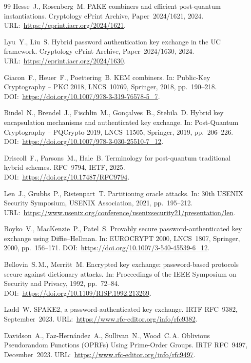 \documentclass[preprint,12pt]{elsarticle}
\theoremstyle{remark}
\begin{document}
\begin{thebibliography}{99}
Hesse~J., Rosenberg~M.
PAKE combiners and efficient post-quantum instantiations.
Cryptology ePrint Archive, Paper~2024/1621, 2024.
URL:~\url{https://eprint.iacr.org/2024/1621}.

Lyu~Y., Liu~S.
Hybrid password authentication key exchange in the UC framework.
Cryptology ePrint Archive, Paper~2024/1630, 2024.
URL:~\url{https://eprint.iacr.org/2024/1630}.

Giacon~F., Heuer~F., Poettering~B.
KEM combiners.
In: Public-Key Cryptography -- PKC 2018, LNCS~10769, Springer, 2018, pp.~190--218.
DOI:~\url{https://doi.org/10.1007/978-3-319-76578-5_7}.

Bindel~N., Brendel~J., Fischlin~M., Gon\c{c}alves~B., Stebila~D.
Hybrid key encapsulation mechanisms and authenticated key exchange.
In: Post-Quantum Cryptography -- PQCrypto 2019, LNCS~11505, Springer, 2019, pp.~206--226.
DOI:~\url{https://doi.org/10.1007/978-3-030-25510-7_12}.

Driscoll~F., Parsons~M., Hale~B.
Terminology for post-quantum traditional hybrid schemes.
RFC~9794, IETF, 2025.
DOI:~\url{https://doi.org/10.17487/RFC9794}.

Len~J., Grubbs~P., Ristenpart~T.
Partitioning oracle attacks.
In: 30th USENIX Security Symposium, USENIX Association, 2021, pp.~195--212.
URL:~\url{https://www.usenix.org/conference/usenixsecurity21/presentation/len}.

Boyko~V., MacKenzie~P., Patel~S.
Provably secure password-authenticated key exchange using Diffie--Hellman.
In: EUROCRYPT 2000, LNCS~1807, Springer, 2000, pp.~156--171.
DOI:~\url{https://doi.org/10.1007/3-540-45539-6_12}.

Bellovin~S.\,M., Merritt~M.
Encrypted key exchange: password-based protocols secure against dictionary attacks.
In: Proceedings of the IEEE Symposium on Security and Privacy, 1992, pp.~72--84.
DOI:~\url{https://doi.org/10.1109/RISP.1992.213269}.

Ladd~W.
SPAKE2, a password-authenticated key exchange.
IRTF RFC~9382, September~2023.
URL:~\url{https://www.rfc-editor.org/info/rfc9382}.

Davidson~A., Faz-Hern\'{a}ndez~A., Sullivan~N., Wood~C.\,A.
Oblivious Pseudorandom Functions (OPRFs) Using Prime-Order Groups.
IRTF RFC~9497, December~2023.
URL:~\url{https://www.rfc-editor.org/info/rfc9497}.


\end{thebibliography}
\end{document}
